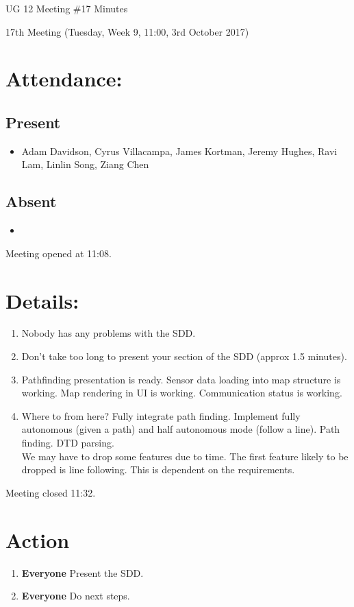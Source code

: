 \documentclass{article}
\begin{document}
\begin{adjustwidth}{2.5em}{0pt}
\begin{center}
\Large{UG 12 Meeting \#17 Minutes}\\
\end{center}
\end{adjustwidth}

17th Meeting (Tuesday, Week 9, 11:00, 3rd October 2017)
\section{Attendance:}
\subsection*{Present}
\begin{itemize}
\item Adam Davidson, Cyrus Villacampa, James Kortman, Jeremy Hughes, Ravi Lam, Linlin Song, Ziang Chen
\end{itemize}
\subsection*{Absent}
\begin{itemize}
\item 
\end {itemize}

Meeting opened at 11:08.
\section{Details:}
\begin{enumerate}
\item Nobody has any problems with the SDD.
\item Don't take too long to present your section of the SDD (approx 1.5 minutes).
\item Pathfinding presentation is ready. Sensor data loading into map structure is working. Map rendering in UI is working. Communication status is working.
\item Where to from here? Fully integrate path finding. Implement fully autonomous (given a path) and half autonomous mode (follow a line). Path finding. DTD parsing.\\
We may have to drop some features due to time. The first feature likely to be dropped is line following. This is dependent on the requirements.
\end{enumerate}

Meeting closed 11:32.

\section{Action}
\begin{enumerate}
\item \textbf{Everyone} Present the SDD.
\item \textbf{Everyone} Do next steps.
\end{enumerate}
\end{document}
